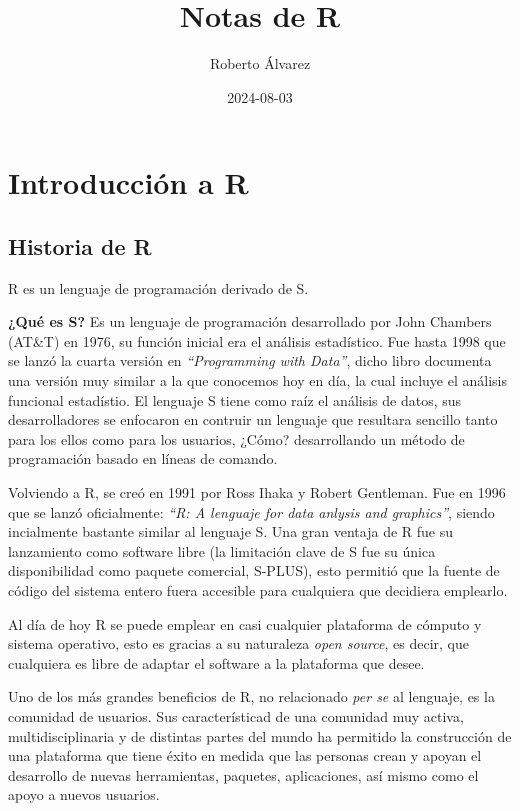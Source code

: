 \documentclass[
]{book}
\title{Notas de R}
\author{Roberto Álvarez}
\date{2024-08-03}
\begin{document}
\maketitle

{
\setcounter{tocdepth}{1}
\tableofcontents
}
\chapter{Introducción a R}\label{intro}

\section{Historia de R}\label{historia-de-r}

R es un lenguaje de programación derivado de S.

\textbf{¿Qué es S?} Es un lenguaje de programación desarrollado por John Chambers (AT\&T) en 1976, su función inicial era el análisis estadístico. Fue hasta 1998 que se lanzó la cuarta versión en \emph{``Programming with Data''}, dicho libro documenta una versión muy similar a la que conocemos hoy en día, la cual incluye el análisis funcional estadístio. El lenguaje S tiene como raíz el análisis de datos, sus desarrolladores se enfocaron en contruir un lenguaje que resultara sencillo tanto para los ellos como para los usuarios, ¿Cómo? desarrollando un método de programación basado en líneas de comando.

Volviendo a R, se creó en 1991 por Ross Ihaka y Robert Gentleman. Fue en 1996 que se lanzó oficialmente: \emph{``R: A lenguaje for data anlysis and graphics''}, siendo incialmente bastante similar al lenguaje S. Una gran ventaja de R fue su lanzamiento como software libre (la limitación clave de S fue su única disponibilidad como paquete comercial, S-PLUS), esto permitió que la fuente de código del sistema entero fuera accesible para cualquiera que decidiera emplearlo.

Al día de hoy R se puede emplear en casi cualquier plataforma de cómputo y sistema operativo, esto es gracias a su naturaleza \emph{open source}, es decir, que cualquiera es libre de adaptar el software a la plataforma que desee.

Uno de los más grandes beneficios de R, no relacionado \emph{per se} al lenguaje, es la comunidad de usuarios. Sus característicad de una comunidad muy activa, multidisciplinaria y de distintas partes del mundo ha permitido la construcción de una plataforma que tiene éxito en medida que las personas crean y apoyan el desarrollo de nuevas herramientas, paquetes, aplicaciones, así mismo como el apoyo a nuevos usuarios.
\end{document}
